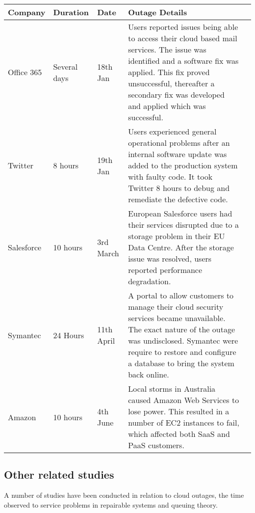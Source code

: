 \documentclass[5p]{elsarticle}
\begin{document}
\begin {table*}[]
\caption {Summary of high profile Cloud outages in 2016} 
\begin{flushleft}

\begin{tabular}{l | l | l | p{11.7cm} l} Company & Duration & Date & Outage Details 
\\ \hline Office 365 & Several days &  18th Jan & Users reported issues being able to access their cloud based mail services. The issue was identified and a software fix was applied. This fix proved unsuccessful, thereafter  a secondary fix was developed and applied which was successful.

\\ Twitter & 8 hours  & 19th Jan & Users experienced general operational problems after an internal software update was added to the production system with faulty code. It took Twitter 8 hours to debug and remediate the defective code.

\\  Salesforce & 10 hours  &  3rd March &  European Salesforce users had their services disrupted due to a storage problem in their EU Data Centre. After the storage issue was resolved, users reported performance degradation.

\\  Symantec & 24 Hours  &  11th April &  A portal to allow customers to manage their cloud  security services became unavailable. The exact nature of the outage was undisclosed. Symantec were require to restore and configure a database to bring the system back online.

\\ Amazon & 10 hours  & 4th June & Local storms in Australia caused Amazon Web Services to lose power. This resulted in a number of EC2 instances to fail, which affected both SaaS and PaaS customers. 
\\ \hline 

 \end{tabular}
\end{flushleft}
\end{table*}

\subsection{Other related studies}
A number of studies have been conducted in relation to cloud outages, the time observed to service problems in repairable systems and queuing theory. \par
\end{document}
